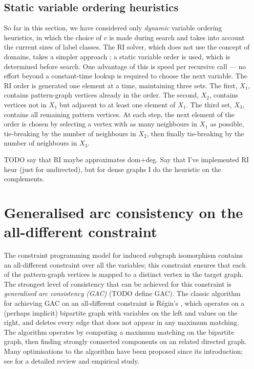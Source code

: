 \subsection{Static variable ordering heuristics}

So far in this section, we have considered only \emph{dynamic} variable ordering heuristics,
in which the choice of $v$ is made during search and takes into account the current
sizes of label classes.  The RI solver, which does not use the concept of domains,
takes a simpler approach \cite{DBLP:journals/tcbb/BonniciG17}; a static variable order
is used, which is determined before search.  One advantage of this is speed per recursive
call --- no effort beyond a constant-time lookup is required to choose the next variable.
The RI order is generated one element at a time, maintaining three sets.  The first, $X_1$,
contains pattern-graph vertices already in the order. The second, $X_2$, contains vertices
not in $X_1$ but adjacent to at least one element of $X_1$.  The third set, $X_3$, contains
all remaining pattern vertices.  At each step, the next element of the order is chosen
by selecting a vertex with as many neighbours in $X_1$ as possible, tie-breaking by
the number of neighbours in $X_2$, then finally tie-breaking by the number of neighbours
in $X_3$.

TODO say that RI maybe approximates dom+deg. Say that I've implemented RI heur (just
for undirected), but for dense graphs I do the heuristic on the complements.

\section{Generalised arc consistency on the all-different constraint}

The constraint programming model for induced subgraph isomorphism contains an all-different
constraint over all the variables; this constraint ensures that each of the pattern-graph vertices
is mapped to a distinct vertex in the target graph.  The strongest level of consistency that can
be achieved for this constraint is \emph{generalised arc consistency (GAC)} (TODO define GAC).
The classic algorithm for achieving GAC on an all-different constraint is R\'egin's
\cite{DBLP:conf/aaai/Regin94}, which operates
on a (perhaps implicit) bipartite graph with variables on the left and values on the right, and 
deletes every edge that does not appear in any maximum matching.  The algorithm operates by computing
a maximum matching on the bipartite graph, then finding strongly connected components on an related directed
graph.  Many optimisations to the algorithm have been proposed since its introduction; see
\cite{DBLP:journals/ai/GentMN08} for a detailed review and empirical study.

